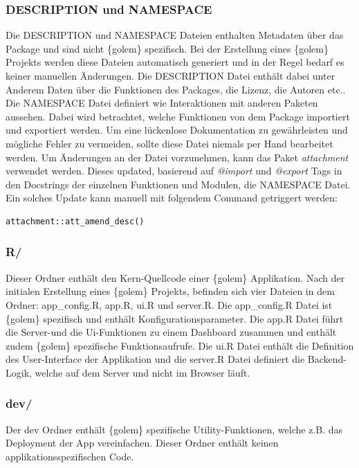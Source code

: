 \subsubsection{DESCRIPTION und NAMESPACE}
Die DESCRIPTION und NAMESPACE Dateien enthalten Metadaten über das Package und sind nicht \{golem\} spezifisch.\newline 
Bei der Erstellung eines \{golem\} Projekts werden diese Dateien automatisch generiert und in der Regel bedarf es keiner manuellen Änderungen. \newline
Die DESCRIPTION Datei enthält dabei unter Anderem Daten über die Funktionen des Packages, die Lizenz, die Autoren etc.. \newline
Die NAMESPACE Datei definiert wie Interaktionen mit anderen Paketen aussehen. Dabei wird betrachtet, welche Funktionen von dem Package importiert und exportiert werden.\newline
Um eine lückenlose Dokumentation zu gewährleisten und mögliche Fehler zu vermeiden, sollte diese Datei niemals per Hand bearbeitet werden. Um Änderungen an der Datei vorzunehmen, kann das Paket \emph{attachment} \citep{Rochette2021} verwendet werden. Dieses updated, basierend auf \emph{@import} und \emph{@export} Tags in den Docstrings der einzelnen Funktionen und Modulen, die NAMESPACE Datei.
Ein solches Update kann manuell mit folgendem Command getriggert werden:
\begin{lstlisting}
attachment::att_amend_desc()
\end{lstlisting}

\subsubsection{R/}
Dieser Ordner enthält den Kern-Quellcode einer \{golem\} Applikation. 
Nach der initialen Erstellung eines \{golem\} Projekts, befinden sich vier Dateien in dem Ordner: app\_config.R, app.R, ui.R und server.R. \newline 
Die app\_config.R Datei ist \{golem\} spezifisch und enthält Konfigurationsparameter.\newline 
Die app.R Datei führt die Server-und die Ui-Funktionen zu einem Dashboard zusammen und enthält zudem \{golem\} spezifische Funktionsaufrufe. \newline 
Die ui.R Datei enthält die Definition des User-Interface der Applikation und die server.R Datei definiert die Backend-Logik, welche auf dem Server und nicht im Browser läuft.

\subsubsection{dev/}
Der dev Ordner enthält \{golem\} spezifische Utility-Funktionen, welche z.B. das Deployment der App vereinfachen. Dieser Ordner enthält keinen applikationsspezifischen Code. 

